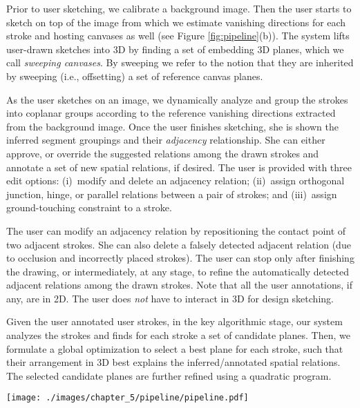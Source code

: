 Prior to user sketching, we calibrate a background image. Then the user starts to sketch on top of the image from which we estimate vanishing directions for each stroke and hosting canvases as well (see Figure \ref{fig:pipeline}(b)). The system lifts user-drawn sketches into 3{D} by finding a set of embedding 3{D} planes, which we call \emph{sweeping canvases}. By sweeping we refer to the notion that they are inherited by sweeping (i.e., offsetting) a set of reference canvas planes.

As the user sketches on an image, we dynamically analyze and group the strokes into coplanar groups according to the reference vanishing directions extracted from the background image. Once the user finishes sketching, she is shown the inferred segment groupings and their {\em adjacency} relationship. She can either approve, or override the suggested relations among the drawn strokes and annotate a set of new spatial relations, if desired. The user is provided with three edit options: (i)~modify and delete an adjacency relation;
(ii)~assign orthogonal junction, hinge, or parallel relations between a pair of strokes; and (iii)~assign ground-touching constraint to a stroke.

%
The user can modify an adjacency relation by repositioning the contact point of two adjacent strokes. She can also delete a falsely detected adjacent relation (due to occlusion and incorrectly placed strokes). The user can stop only after finishing the drawing, or intermediately, at any stage, to refine the automatically detected adjacent relations among the drawn strokes.
Note that all the user annotations, if any, are in 2D. The user does {\em not} have to interact in 3D for design sketching.

Given the user annotated user strokes, in the key algorithmic stage, our system analyzes the strokes and finds for each stroke a set of candidate planes. Then, we formulate a global optimization to select a best plane for each stroke, such that their arrangement in 3D best explains the inferred/annotated spatial relations. The selected candidate planes are further refined using a quadratic program.

\begin{figure*}[t!]
  \texttt{[image: ./images/chapter\_5/pipeline/pipeline.pdf]}
  \caption{Starting from a single image, the user annotates vanishing line information~(a). She continues by sketching on top of the image. We estimate the respective vanishing information for each stroke with a set of automatically grouped strokes (different colors) exposed to the user~(b). The user can modify the grouping results, or inter-stroke contact relations, then our system automatically lift a set of 3{D} canvases that host the strokes~(c).  %
  Our system dynamically infers spatial structure from the user sketches~(d).}
  \label{fig:pipeline}
  \vnudge
\end{figure*}


